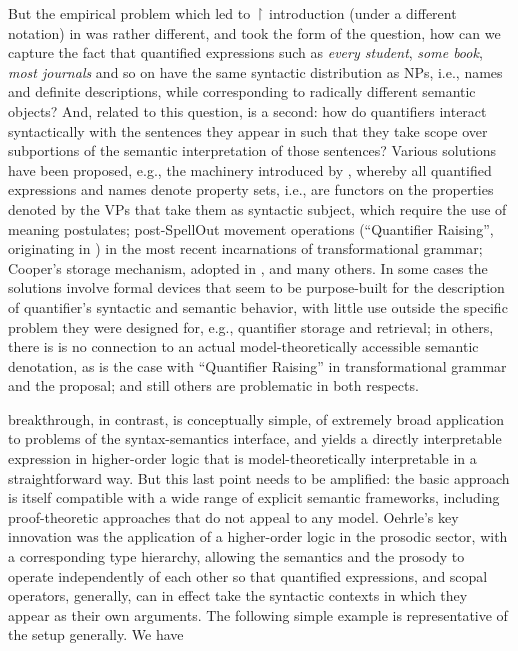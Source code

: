 \documentclass[output=paper,colorlinks,citecolor=brown]{langscibook}
\begin{document}
But the empirical problem which led to \ensuremath{\vs} introduction (under a different
notation) in \citet{oehrle1994} was rather different, and took the form of
the question, how can we capture the fact that quantified expressions
such as \textit{every student}, \textit{some book}, \textit{most journals} and so on have
the same syntactic distribution as NPs, i.e., names and definite
descriptions, while corresponding to radically different semantic
objects? And, related to this question, is a second: how do
quantifiers interact syntactically with the sentences they appear in
such that they take scope over subportions of the semantic
interpretation of those sentences? Various solutions have been
proposed, e.g., the machinery introduced by \citet{montague1973a}, whereby all quantified expressions and
names denote property sets, i.e., are functors on the properties
denoted by the VPs that take them as syntactic subject, which require
the use of meaning postulates; post-SpellOut
movement operations (``Quantifier Raising'', originating in
\citealt{may_r1985a}) in the most recent incarnations of transformational
grammar; Cooper's \citeyearpar{cooper75,Cooper83}
storage mechanism, adopted in \citet{pollardsag94}, and many others. In
some cases the solutions involve formal devices that seem to be
purpose-built for the description of quantifier's syntactic and
semantic behavior, with little use outside the specific problem they
were designed for, e.g., quantifier storage and retrieval; in others,
there is is no connection to an actual model-theoretically accessible
semantic denotation, as is the case with ``Quantifier Raising'' in
transformational grammar and the \citet{pollardsag94} proposal; and still
others are problematic in both respects.

 breakthrough, in contrast, is conceptually simple, of
extremely broad application to problems of the syntax-semantics
interface, and yields a directly interpretable expression in
higher-order logic that is model-theoretically interpretable in a
straightforward way. But this last point needs to be amplified: the
basic approach is itself compatible with a wide range of explicit
semantic frameworks, including proof-theoretic approaches that do not
appeal to any model. Oehrle's key innovation was the application of a
higher-order logic in the prosodic sector, with a corresponding type
hierarchy, allowing the semantics and the prosody to operate
independently of each other so that quantified expressions, and scopal
operators, generally, can in effect take the syntactic contexts in
which they appear as their own arguments. The following simple example
is representative of the setup generally. We have
\end{document}
